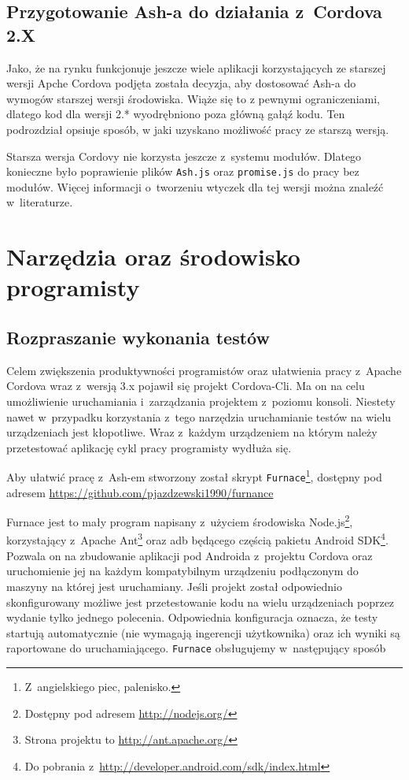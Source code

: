 \documentclass[brudnopis]{xmgr}
\begin{document}
\section{Przygotowanie Ash-a do działania z~Cordova 2.X}\label{cordova_2.x}

Jako, że na rynku funkcjonuje jeszcze wiele aplikacji korzystających ze starszej wersji Apche Cordova podjęta została decyzja, aby dostosować Ash-a do wymogów starszej wersji środowiska. Wiąże się to z pewnymi ograniczeniami, dlatego kod dla wersji 2.* wyodrębniono poza główną gałąź kodu. Ten podrozdział opsiuje sposób, w jaki uzyskano możliwość pracy ze starszą wersją. 

Starsza wersja Cordovy nie korzysta jeszcze z~systemu modułów. Dlatego konieczne było poprawienie plików \texttt{Ash.js} oraz \texttt{promise.js} do pracy bez modułów. Więcej informacji o~tworzeniu wtyczek dla tej wersji można znaleźć w~literaturze\cite{Ghatol-Patel}.

\chapter{Narzędzia oraz środowisko programisty}

\section{Rozpraszanie wykonania testów}

Celem zwiększenia produktywności programistów oraz ułatwienia pracy z~Apache Cordova wraz z~wersją 3.x pojawił się projekt Cordova-Cli. Ma on na celu umożliwienie uruchamiania i~zarządzania projektem z~poziomu konsoli. Niestety nawet w~przypadku korzystania z~tego narzędzia uruchamianie testów na wielu urządzeniach jest kłopotliwe. Wraz z~każdym urządzeniem na którym należy przetestować aplikację cykl pracy programisty wydłuża się.

Aby ułatwić pracę z~Ash-em stworzony został skrypt \texttt{Furnace}\footnote{Z~angielskiego piec, palenisko.}, dostępny pod adresem \url{https://github.com/pjazdzewski1990/furnance}

Furnace jest to mały program napisany z~użyciem środowiska Node.js\footnote{Dostępny pod adresem \url{http://nodejs.org/} }, korzystający z~Apache Ant\footnote{Strona projektu to  \url{http://ant.apache.org/} } oraz adb będącego częścią pakietu Android SDK\footnote{Do pobrania z~\url{http://developer.android.com/sdk/index.html} }. Pozwala on na zbudowanie aplikacji pod Androida z~projektu Cordova oraz uruchomienie jej na każdym kompatybilnym urządzeniu podłączonym do maszyny na której jest uruchamiany. Jeśli projekt został odpowiednio skonfigurowany możliwe jest przetestowanie kodu na wielu urządzeniach poprzez wydanie tylko jednego polecenia. Odpowiednia konfiguracja oznacza, że testy startują automatycznie (nie wymagają ingerencji użytkownika) oraz ich wyniki są raportowane do uruchamiającego. \texttt{Furnace} obsługujemy w~następujący sposób
\end{document}
